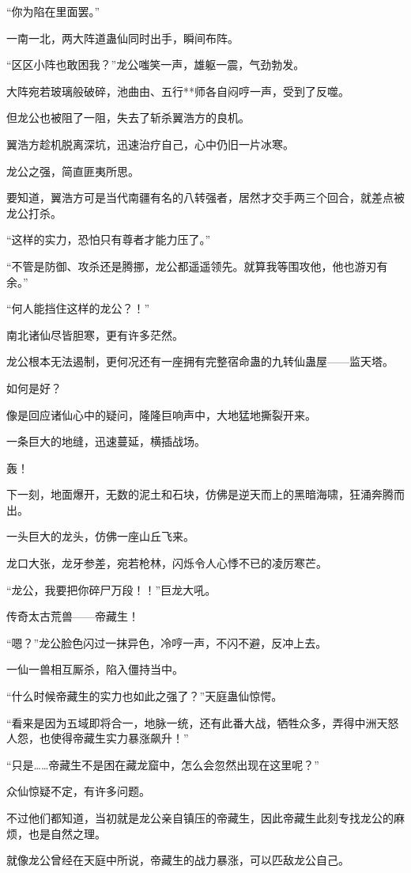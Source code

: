 \begin{this_body}
“你为陷在里面罢。”

一南一北，两大阵道蛊仙同时出手，瞬间布阵。

“区区小阵也敢困我？”龙公嗤笑一声，雄躯一震，气劲勃发。

大阵宛若玻璃般破碎，池曲由、五行**师各自闷哼一声，受到了反噬。

但龙公也被阻了一阻，失去了斩杀翼浩方的良机。

翼浩方趁机脱离深坑，迅速治疗自己，心中仍旧一片冰寒。

龙公之强，简直匪夷所思。

要知道，翼浩方可是当代南疆有名的八转强者，居然才交手两三个回合，就差点被龙公打杀。

“这样的实力，恐怕只有尊者才能力压了。”

“不管是防御、攻杀还是腾挪，龙公都遥遥领先。就算我等围攻他，他也游刃有余。”

“何人能挡住这样的龙公？！”

南北诸仙尽皆胆寒，更有许多茫然。

龙公根本无法遏制，更何况还有一座拥有完整宿命蛊的九转仙蛊屋——监天塔。

如何是好？

像是回应诸仙心中的疑问，隆隆巨响声中，大地猛地撕裂开来。

一条巨大的地缝，迅速蔓延，横插战场。

轰！

下一刻，地面爆开，无数的泥土和石块，仿佛是逆天而上的黑暗海啸，狂涌奔腾而出。

一头巨大的龙头，仿佛一座山丘飞来。

龙口大张，龙牙参差，宛若枪林，闪烁令人心悸不已的凌厉寒芒。

“龙公，我要把你碎尸万段！！”巨龙大吼。

传奇太古荒兽——帝藏生！

“嗯？”龙公脸色闪过一抹异色，冷哼一声，不闪不避，反冲上去。

一仙一兽相互厮杀，陷入僵持当中。

“什么时候帝藏生的实力也如此之强了？”天庭蛊仙惊愕。

“看来是因为五域即将合一，地脉一统，还有此番大战，牺牲众多，弄得中洲天怒人怨，也使得帝藏生实力暴涨飙升！”

“只是……帝藏生不是困在藏龙窟中，怎么会忽然出现在这里呢？”

众仙惊疑不定，有许多问题。

不过他们都知道，当初就是龙公亲自镇压的帝藏生，因此帝藏生此刻专找龙公的麻烦，也是自然之理。

就像龙公曾经在天庭中所说，帝藏生的战力暴涨，可以匹敌龙公自己。


\end{this_body}
